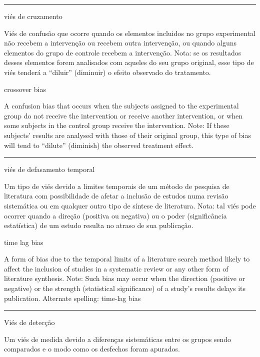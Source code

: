 \documentclass[
  openany]{book}
\begin{document}
\begin{center}\rule{0.5\linewidth}{0.5pt}\end{center}

viés de cruzamento

Viés de confusão que ocorre quando os elementos incluidos no grupo experimental não recebem a intervenção ou recebem outra intervenção, ou quando alguns elementos do grupo de controle recebem a intervenção. Nota: se os resultados desses elementos forem analisados com aqueles do seu grupo original, esse tipo de viés tenderá a ``diluir'' (diminuir) o efeito observado do tratamento.

crossover bias

A confusion bias that occurs when the subjects assigned to the experimental group do not receive the intervention or receive another intervention, or when some subjects in the control group receive the intervention. Note: If these subjects' results are analysed with those of their original group, this type of bias will tend to ``dilute'' (diminish) the observed treatment effect.

\begin{center}\rule{0.5\linewidth}{0.5pt}\end{center}

viés de defasamento temporal

Um tipo de viés devido a limites temporais de um método de pesquisa de literatura com possibilidade de afetar a inclusão de estudos numa revisão sistemática ou em qualquer outro tipo de síntese de literatura. Nota: tal viés pode ocorrer quando a direção (positiva ou negativa) ou o poder (significância estatística) de um estudo resulta no atraso de sua publicação.

time lag bias

A form of bias due to the temporal limits of a literature search method likely to affect the inclusion of studies in a systematic review or any other form of literature synthesis. Note: Such bias may occur when the direction (positive or negative) or the strength (statistical significance) of a study's results delays its publication. Alternate spelling: time-lag bias

\begin{center}\rule{0.5\linewidth}{0.5pt}\end{center}

Viés de detecção

Um viés de medida devido a diferenças sistemáticas entre os grupos sendo comparados e o modo como os desfechos foram apurados.
\end{document}
